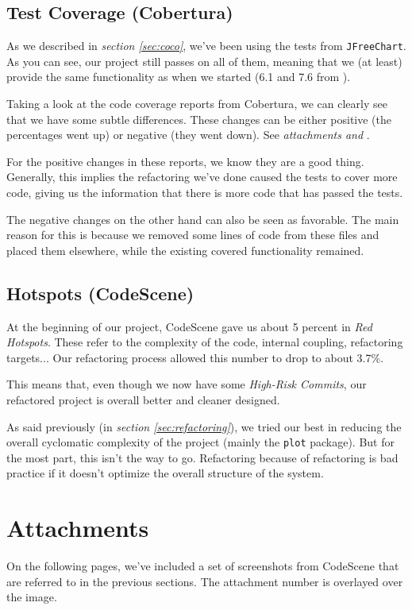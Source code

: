 \documentclass[11pt]{article}
\begin{document}
	\subsection{Test Coverage (Cobertura)}
	As we described in \textsl{section \ref{sec:coco}}, we've been using the tests from \texttt{JFreeChart}. As you can see, our project still passes on all of them, meaning that we (at least) provide the same functionality as when we started (6.1 and 7.6 from \cite{demeyer2009object}).
	
	Taking a look at the code coverage reports from \textsf{Cobertura}, we can clearly see that we have some subtle differences. These changes can be either positive (the percentages went up) or negative (they went down). See \textsl{attachments \pageref{refactoring-package-plot} and \pageref{cobertura-begin}}.
	
	For the positive changes in these reports, we know they are a good thing. Generally, this implies the refactoring we've done caused the tests to cover more code, giving us the information that there is more code that has passed the tests.
	
	The negative changes on the other hand can also be seen as favorable. The main reason for this is because we removed some lines of code from these files and placed them elsewhere, while the existing covered functionality remained.
	
	\subsection{Hotspots (CodeScene)}
	At the beginning of our project, \textsf{CodeScene} gave us about 5 percent in \textsl{Red Hotspots}. These refer to the complexity of the code, internal coupling, refactoring targets... Our refactoring process allowed this number to drop to about 3.7\%.
	
	This means that, even though we now have some \textsl{High-Risk Commits}, our refactored project is overall better and cleaner designed.
	
	As said previously (in \textsl{section \ref{sec:refactoring}}), we tried our best in reducing the overall cyclomatic complexity of the project (mainly the \texttt{plot} package). But for the most part, this isn't the way to go. Refactoring because of refactoring is bad practice if it doesn't optimize the overall structure of the system.

	\clearpage
	
	
	
	\section*{Attachments}
	On the following pages, we've included a set of screenshots from \textsf{CodeScene} that are referred to in the previous sections. The attachment number is overlayed over the image.
	
\end{document}
